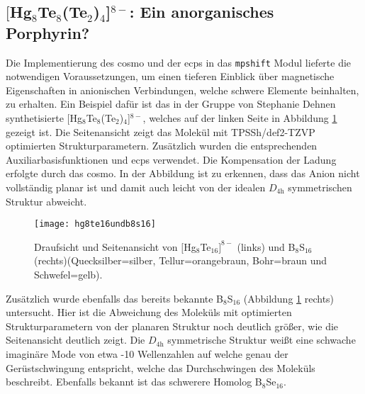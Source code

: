 \subsection{\texorpdfstring{$[$Hg$_8$Te$_8$(Te$_2$)$_4$]$^{8-}$}{[Hg\_8Te\_8(Te\_2)\_4]8-}: Ein anorganisches Porphyrin?}\label{anorgporh}
Die Implementierung des \ac{cosmo}\supercite{klamt1993cosmo} und der \acp{ecp} in das \texttt{mpshift} Modul lieferte die notwendigen Voraussetzungen, um einen tieferen Einblick über magnetische Eigenschaften in anionischen Verbindungen, welche schwere Elemente beinhalten, zu erhalten. Ein Beispiel dafür ist das in der Gruppe von Stephanie Dehnen synthetisierte $[$Hg$_8$Te$_8$(Te$_2$)$_4$]$^{8-}$\supercite{dehnenhg4te8}, welches auf der linken Seite in Abbildung \ref{abb:hg8te16undb8s16} gezeigt ist. Die Seitenansicht zeigt das Molekül mit TPSSh\supercite{tao2003climbing}/def2-TZVP\supercite{weigend2005balanced} optimierten Strukturparametern. Zusätzlich wurden die entsprechenden Auxiliarbasisfunktionen\supercite{weigend2006accurate} und \acp{ecp}\supercite{peterson2003systematically} verwendet. Die Kompensation der Ladung erfolgte durch das \ac{cosmo}. In der Abbildung ist zu erkennen, dass das Anion nicht vollständig planar ist und damit auch leicht von der idealen $D_{4\textrm{h}}$ symmetrischen Struktur abweicht. 
\begin{figure}[ht!]
	\centering
	\texttt{[image: hg8te16undb8s16]}
	\captionsetup{figurewithin = chapter}
	\captionsetup{font=small, labelfont=bf}\caption[{Abbildung von $[$Hg$_8$Te$_{16}]^{8-}$ und B$_8$S$_{16}$}]{{Draufsicht und Seitenansicht von $[$Hg$_8$Te$_{16}]^{8-}$} (links) und B$_8$S$_{16}$ (rechts)(Quecksilber=silber, Tellur=orangebraun, Bohr=braun und Schwefel=gelb).}
\label{abb:hg8te16undb8s16}
\end{figure}

Zusätzlich wurde ebenfalls das bereits bekannte B$_8$S$_{16}$\supercite{krebs1980b8s16} (Abbildung \ref{abb:hg8te16undb8s16} rechts) untersucht. Hier ist die Abweichung des Moleküls mit optimierten Strukturparametern von der planaren Struktur noch deutlich größer, wie die Seitenansicht deutlich zeigt. Die $D_{4\textrm{h}}$ symmetrische Struktur weißt eine schwache imaginäre Mode von etwa -10 Wellenzahlen auf welche genau der Gerüstschwingung entspricht, welche das Durchschwingen des Moleküls beschreibt. Ebenfalls bekannt ist das schwerere Homolog B$_8$Se$_{16}$.

